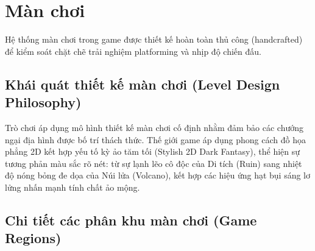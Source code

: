 \documentclass[../DoAn.tex]{subfiles}
\begin{document}
\section{Màn chơi}
\label{section:3.7}

Hệ thống màn chơi trong game được thiết kế hoàn toàn thủ công (handcrafted) để kiểm soát chặt chẽ trải nghiệm platforming và nhịp độ chiến đấu.

\subsection{Khái quát thiết kế màn chơi (Level Design Philosophy)}
\label{subsection:3.8.1}

Trò chơi áp dụng mô hình thiết kế màn chơi cố định nhằm đảm bảo các chướng ngại địa hình được bố trí thách thức. Thế giới game áp dụng phong cách đồ họa phẳng 2D kết hợp yếu tố kỳ ảo tăm tối (Stylish 2D Dark Fantasy), thể hiện sự tương phản màu sắc rõ nét: từ sự lạnh lẽo cô độc của Di tích (Ruin) sang nhiệt độ nóng bỏng đe dọa của Núi lửa (Volcano), kết hợp các hiệu ứng hạt bụi sáng lơ lửng nhấn mạnh tính chất ảo mộng.

\subsection{Chi tiết các phân khu màn chơi (Game Regions)}
\label{subsection:3.8.2}
\end{document}
